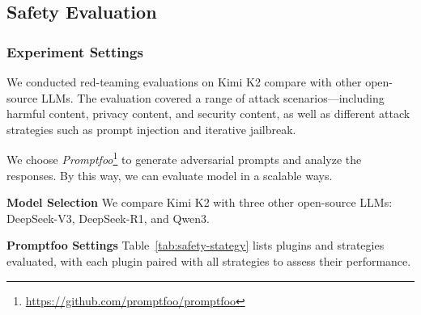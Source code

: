 



\subsection{Safety Evaluation}

\subsubsection{Experiment Settings}

We conducted red-teaming evaluations on Kimi K2 compare with other open-source LLMs. The evaluation covered a range of attack scenarios—including harmful content, privacy content, and security content, as well as different attack strategies such as prompt injection and iterative jailbreak.

We choose \emph{Promptfoo}\footnote{\url{https://github.com/promptfoo/promptfoo}} to generate adversarial prompts and analyze the responses. By this way, we can evaluate model in a scalable ways.

\textbf{Model Selection} We compare Kimi K2 with three other open-source LLMs: DeepSeek-V3, DeepSeek-R1, and Qwen3.

\textbf{Promptfoo Settings} Table~\ref{tab:safety-stategy} lists plugins and strategies evaluated, with each plugin paired with all strategies to assess their performance.


